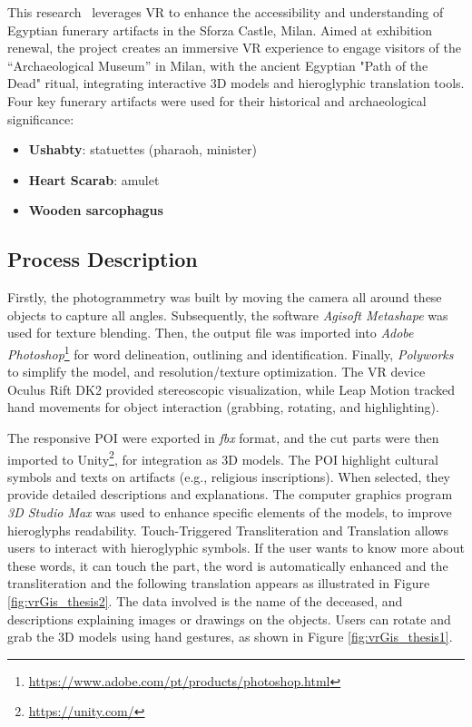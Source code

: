 This research~\cite{gonizzi20153d} leverages \gls{VR} to enhance the accessibility and understanding of Egyptian funerary artifacts in the Sforza Castle, Milan. 
Aimed at exhibition renewal, the project creates an immersive \gls{VR} experience to engage visitors of the “Archaeological Museum” in Milan, with the ancient Egyptian "Path of the Dead" ritual, integrating interactive \gls{3D} models and hieroglyphic translation tools. Four key funerary artifacts were used for their historical and archaeological significance:
\begin{itemize}
  \item \textbf{Ushabty}: statuettes (pharaoh, minister)
  \item \textbf{Heart Scarab}: amulet
  \item \textbf{Wooden sarcophagus} 
\end{itemize}



\subsection*{Process Description}

Firstly, the photogrammetry was built by moving the camera all around these objects to capture all angles. Subsequently, the software \textit{Agisoft Metashape} was used for texture blending. Then, the output file was imported into \textit{Adobe Photoshop}\footnote{\url{https://www.adobe.com/pt/products/photoshop.html}} for word delineation, outlining and identification. 
Finally, \textit{Polyworks} to simplify the model, and resolution/texture optimization.
The \gls{VR} device Oculus Rift DK2 provided stereoscopic visualization, while Leap Motion tracked hand movements for object interaction (grabbing, rotating, and highlighting).

The responsive \gls{POI} were exported in \textit{fbx} format, and the cut parts were then imported to Unity\footnote{\url{https://unity.com/}}, for integration as \gls{3D} models.
The \gls{POI} highlight cultural symbols and texts on artifacts (e.g., religious inscriptions). When selected, they provide detailed descriptions and explanations.
The computer graphics program \textit{\gls{3D} Studio Max} was used to enhance specific elements of the models, to improve hieroglyphs readability.
Touch-Triggered Transliteration and Translation allows users to interact with hieroglyphic symbols. If the user wants to know more about these words, it can touch the part, the word is automatically enhanced and the transliteration and the following translation appears as illustrated in Figure \ref{fig:vrGis_thesis2}. The data involved is the name of the deceased, and descriptions explaining images or drawings on the objects.
Users can rotate and grab the \gls{3D} models using hand gestures, as shown in Figure \ref{fig:vrGis_thesis1}.


